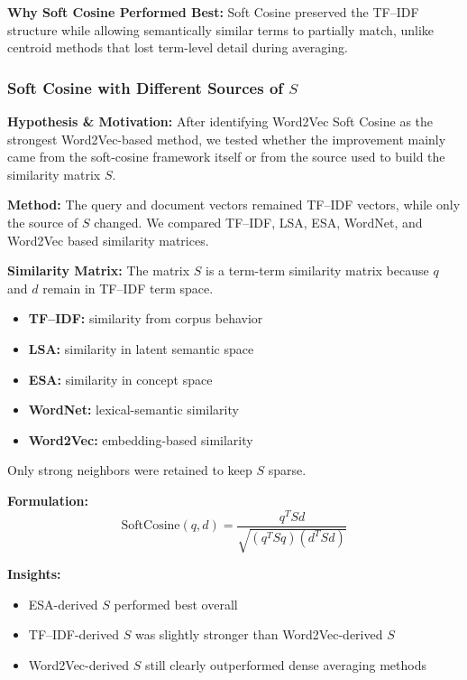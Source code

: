 \documentclass[runningheads]{llncs}
\begin{document}
\textbf{Why Soft Cosine Performed Best:}  
Soft Cosine preserved the TF--IDF structure while allowing semantically similar terms to partially match, unlike centroid methods that lost term-level detail during averaging.

\subsubsection{Soft Cosine with Different Sources of $S$}

\textbf{Hypothesis \& Motivation:}  
After identifying Word2Vec Soft Cosine as the strongest Word2Vec-based method, we tested whether the improvement mainly came from the soft-cosine framework itself or from the source used to build the similarity matrix $S$.

\textbf{Method:}  
The query and document vectors remained TF--IDF vectors, while only the source of $S$ changed. We compared TF--IDF, LSA, ESA, WordNet, and Word2Vec based similarity matrices.

\textbf{Similarity Matrix:}  
The matrix $S$ is a term-term similarity matrix because $q$ and $d$ remain in TF--IDF term space.
\begin{itemize}[noitemsep]
    \item \textbf{TF--IDF:} similarity from corpus behavior
    \item \textbf{LSA:} similarity in latent semantic space
    \item \textbf{ESA:} similarity in concept space
    \item \textbf{WordNet:} lexical-semantic similarity
    \item \textbf{Word2Vec:} embedding-based similarity
\end{itemize}

Only strong neighbors were retained to keep $S$ sparse.

\textbf{Formulation:}
\begin{equation}
\text{SoftCosine}(q, d) = \frac{q^T S d}{\sqrt{(q^T S q)(d^T S d)}}
\end{equation}

\textbf{Insights:}
\begin{itemize}[noitemsep]
    \item ESA-derived $S$ performed best overall
    \item TF--IDF-derived $S$ was slightly stronger than Word2Vec-derived $S$
    \item Word2Vec-derived $S$ still clearly outperformed dense averaging methods
\end{itemize}
\end{document}
